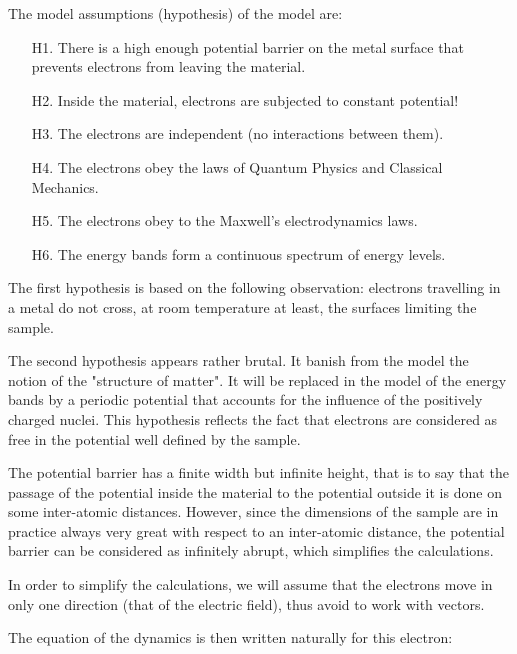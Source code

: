 	The model assumptions (hypothesis) of the model are:
	\begin{enumerate}
		\item[H1.] There is a high enough potential barrier on the metal surface that prevents electrons from leaving the material.

		\item[H2.] Inside the material, electrons are subjected to constant potential!

		\item[H3.] The electrons are independent (no interactions between them).

		\item[H4.] The electrons obey the laws of Quantum Physics and Classical Mechanics.

		\item[H5.] The electrons obey to the Maxwell's electrodynamics laws.

		\item[H6.] The energy bands form a continuous spectrum of energy levels.
	\end{enumerate}
	The first hypothesis is based on the following observation: electrons travelling in a metal do not cross, at room temperature at least, the surfaces limiting the sample.

	The second hypothesis appears rather brutal. It banish from the model the notion of the "structure of matter". It will be replaced in the model of the energy bands by a periodic potential that accounts for the influence of the positively charged nuclei. This hypothesis reflects the fact that electrons are considered as free in the potential well defined by the sample.

	The potential barrier has a finite width but infinite height, that is to say that the passage of the potential inside the material to the potential outside it is done on some inter-atomic distances. However, since the dimensions of the sample are in practice always very great with respect to an inter-atomic distance, the potential barrier can be considered as infinitely abrupt, which simplifies the calculations.
	\begin{tcolorbox}[title=Remark,colframe=black,arc=10pt]
	In order to simplify the calculations, we will assume that the electrons move in only one direction (that of the electric field), thus avoid to work with vectors.
	\end{tcolorbox}
	The equation of the dynamics is then written naturally for this electron:
	
